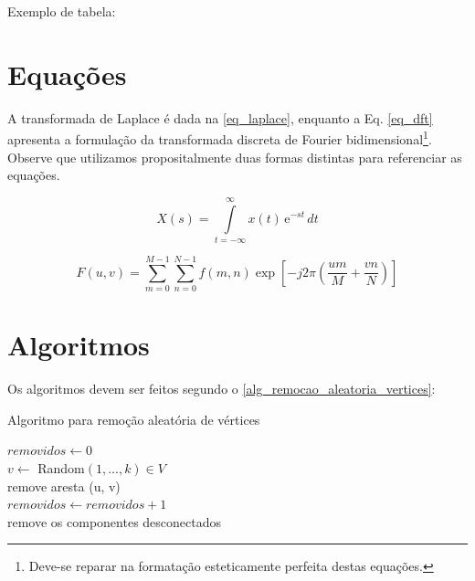 \begin{apendicesenv}
    Exemplo de tabela:

    

    \newpage

    \section{Equações}
    \label{sec_equacoes}

    A transformada de Laplace é dada na \autoref{eq_laplace}, enquanto a Eq. \ref{eq_dft} apresenta a formulação da transformada discreta de Fourier bidimensional\footnote{Deve-se reparar na formatação esteticamente perfeita destas equações.}.
    Observe que utilizamos propositalmente duas formas distintas para referenciar as equações.

    \begin{equation}
        X(s) = \int\limits_{t = -\infty}^{\infty} x(t) \, \text{e}^{-st} \, dt
        \label{eq_laplace}
    \end{equation}

    \begin{equation}
        F(u, v) = \sum_{m = 0}^{M - 1} \sum_{n = 0}^{N - 1} f(m, n) \exp \left[ -j 2 \pi \left( \frac{u m}{M} + \frac{v n}{N} \right) \right]
        \label{eq_dft}
    \end{equation}

    \section{Algoritmos}\label{sec_algoritmos}

    Os  algoritmos devem ser feitos segundo o \autoref{alg_remocao_aleatoria_vertices}:

    \begin{algorithm}
        \caption{Algoritmo para remoção aleatória de vértices}
        \label{alg_remocao_aleatoria_vertices}
        $removidos \leftarrow 0$ \\
         {
            $v \leftarrow$ Random$(1, ..., k) \in V$ \\
             {
                remove aresta (u, v)\\
                $removidos \leftarrow removidos + 1$\\
            }
             {
                remove os componentes desconectados\\
            }
        }
    \end{algorithm}


\end{apendicesenv}
